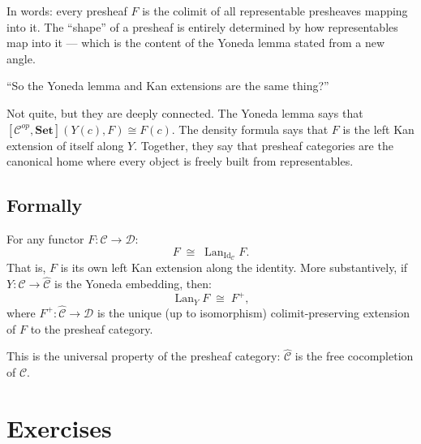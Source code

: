 In words: every presheaf $F$ is the colimit of all representable presheaves
mapping into it. The ``shape'' of a presheaf is entirely determined by how
representables map into it — which is the content of the Yoneda lemma stated
from a new angle.

\begin{dialog}
``So the Yoneda lemma and Kan extensions are the same thing?''

Not quite, but they are deeply connected. The Yoneda lemma says that
$[\mathcal{C}^{op}, \mathbf{Set}](Y(c), F) \cong F(c)$. The density formula
says that $F$ is the left Kan extension of itself along $Y$. Together, they
say that presheaf categories are the canonical home where every object is
freely built from representables.
\end{dialog}

\subsection{Formally}

\begin{theorem}
For any functor $F : \mathcal{C} \to \mathcal{D}$:
\[
  F \;\cong\; \operatorname{Lan}_{\operatorname{Id}_\mathcal{C}} F.
\]
That is, $F$ is its own left Kan extension along the identity. More substantively,
if $Y : \mathcal{C} \to \hat{\mathcal{C}}$ is the Yoneda embedding, then:
\[
  \operatorname{Lan}_Y F \;\cong\; F^+,
\]
where $F^+ : \hat{\mathcal{C}} \to \mathcal{D}$ is the unique (up to isomorphism)
colimit-preserving extension of $F$ to the presheaf category.
\end{theorem}

This is the universal property of the presheaf category: $\hat{\mathcal{C}}$ is
the free cocompletion of $\mathcal{C}$.

\section{Exercises}

